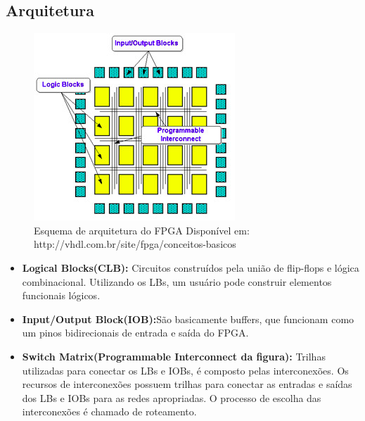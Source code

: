 \documentclass[12pt,a4paper]{article}
\begin{document}
\subsection{Arquitetura}
\begin{figure}[!htb]
\includegraphics[scale=1]{sistema_fpga.jpg}
\centering
\caption{Esquema de arquitetura do FPGA Disponível em: \newline http://vhdl.com.br/site/fpga/conceitos-basicos}
\end{figure}
\begin{itemize}
\item \textbf{Logical Blocks(CLB):} Circuitos  construídos pela união de flip-flops e lógica combinacional. Utilizando os LBs, um usuário pode construir elementos funcionais lógicos.
\item \textbf{Input/Output Block(IOB):}São basicamente buffers, que funcionam como um pinos bidirecionais de entrada e saída do FPGA.
\item \textbf{Switch Matrix(Programmable Interconnect da figura):} Trilhas utilizadas para conectar os LBs e IOBs, é composto pelas interconexões. Os recursos de interconexões possuem trilhas para conectar as entradas e saídas dos LBs e IOBs para as redes apropriadas. O processo de escolha das interconexões é chamado de roteamento. 
\end{itemize}
\end{document}
